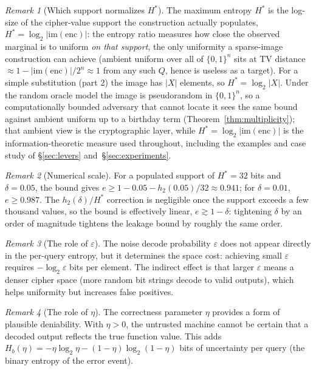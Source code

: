 \documentclass[conference]{IEEEtran}
\theoremstyle{definition}
\theoremstyle{plain}
\theoremstyle{remark}
\newtheorem{remark}{Remark}[section]
\newcommand{\enc}{\mathrm{enc}}
\newcommand{\B}{\{0,1\}}
\begin{document}
\begin{remark}[Which support normalizes $H^*$]
\label{rem:hstar}
The maximum entropy $H^*$ is the log-size of the cipher-value support the
construction actually populates, $H^* = \log_2|\mathrm{im}(\enc)|$: the
entropy ratio measures how close the observed marginal is to uniform
\emph{on that support}, the only uniformity a sparse-image construction
can achieve (ambient uniform over all of $\B^n$ sits at TV distance
$\approx 1 - |\mathrm{im}(\enc)|/2^n \approx 1$ from any such $Q$, hence
is useless as a target).  For a simple substitution (part 2) the image
has $|X|$ elements, so $H^* = \log_2|X|$.  Under the random oracle model
the image is pseudorandom in $\B^n$, so a computationally bounded
adversary that cannot locate it sees the same bound against ambient
uniform up to a birthday term (Theorem~\ref{thm:multiplicity}); that
ambient view is the cryptographic layer, while
$H^* = \log_2|\mathrm{im}(\enc)|$ is the information-theoretic measure
used throughout, including the examples and case study of
\S\ref{sec:levers} and~\S\ref{sec:experiments}.
\end{remark}

\begin{remark}[Numerical scale]
For a populated support of $H^* = 32$ bits and $\delta = 0.05$, the bound
gives $e \geq 1 - 0.05 - h_2(0.05)/32 \approx 0.941$; for $\delta = 0.01$,
$e \geq 0.987$.  The $h_2(\delta)/H^*$ correction is negligible once the
support exceeds a few thousand values, so the bound is effectively
linear, $e \gtrsim 1 - \delta$: tightening $\delta$ by an order of
magnitude tightens the leakage bound by roughly the same order.
\end{remark}

\begin{remark}[The role of $\varepsilon$]
The noise decode probability $\varepsilon$ does not appear directly in
the per-query entropy, but it determines the space cost: achieving small
$\varepsilon$ requires $-\log_2 \varepsilon$ bits per element.  The
indirect effect is that larger $\varepsilon$ means a denser cipher space
(more random bit strings decode to valid outputs), which helps uniformity
but increases false positives.
\end{remark}

\begin{remark}[The role of $\eta$]
The correctness parameter $\eta$ provides a form of plausible
deniability.  With $\eta > 0$, the untrusted machine cannot be certain
that a decoded output reflects the true function value.  This adds
$H_b(\eta) = -\eta \log_2 \eta - (1-\eta) \log_2(1-\eta)$ bits of
uncertainty per query (the binary entropy of the error event).
\end{remark}
\end{document}
